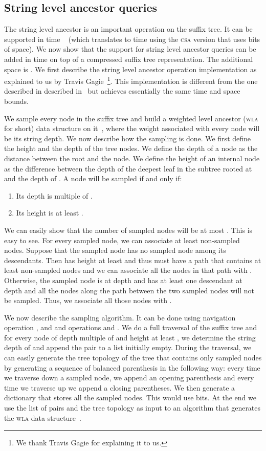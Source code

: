 \documentclass[a4paper]{article}
\begin{document}
\begin{enumerate}
\subsection{String level ancestor queries}
\label{sec:build_blind_child_support}

The string level ancestor is an important operation on the suffix tree. It can be supported in time ~\cite{KKNS13} (which translates to  time using the \textsc{csa} version that uses  bits of space). 
We now show that the support for string level ancestor queries can be added in time  on top of a compressed suffix tree representation. The additional space is . 
We first describe the string level ancestor operation implementation as explained to us by Travis Gagie~\footnote{We thank Travis Gagie for explaining it to us.}. This implementation is different from the one described in described in~\cite{KKNS13} but achieves essentially the same time and space bounds. 


We sample every  node in the suffix tree and build a weighted level ancestor (\textsc{wla} for short) data structure  on it~\cite{FM96}, where the weight associated with every node will be its string depth. 
We now describe how the sampling is done. We first define the height and the depth of the tree nodes. We define the depth
of a node as the distance between the root and the node. We define the height of an internal node  as the difference between the depth of the deepest leaf in the subtree rooted at  and the depth of . 
A node will be sampled if and  only if:
\begin{enumerate}
\item Its depth is multiple of . 
\item Its height is at least . 
\end{enumerate}
We can easily show that the number of sampled nodes will be at most . This is easy to see. For every sampled node, we can associate at least  non-sampled nodes. Suppose that the sampled node  has no sampled node among its descendants. Then  has height at least  and thus must have a path that contains at least  non-sampled nodes and we can associate all the nodes in that path with . Otherwise, the sampled node  is at depth  and has at least one descendant at depth  and all the  nodes along the path between the two sampled nodes will not be sampled. Thus, we associate all those  nodes with . 

We now describe the sampling algorithm. It can be done using navigation operation ,  and  and operations  and . We do a full traversal of the suffix tree and for every node  of depth  multiple of  and height at least , we determine the string depth  of  and append the pair  to a list initially empty. During the traversal, we can easily generate the tree topology of the tree that contains only sampled nodes by generating a sequence of balanced parenthesis in the following way:
every time we traverse down a sampled node, we append an opening parenthesis and every time we traverse up we append a closing parentheses. We then generate a dictionary  that stores all the sampled nodes. This would use  bits. 
At the end we use the list of pairs  and the tree topology as input to an algorithm that generates the \textsc{wla} data structure~\cite{FM96}. 


\end{enumerate}
\end{document}

